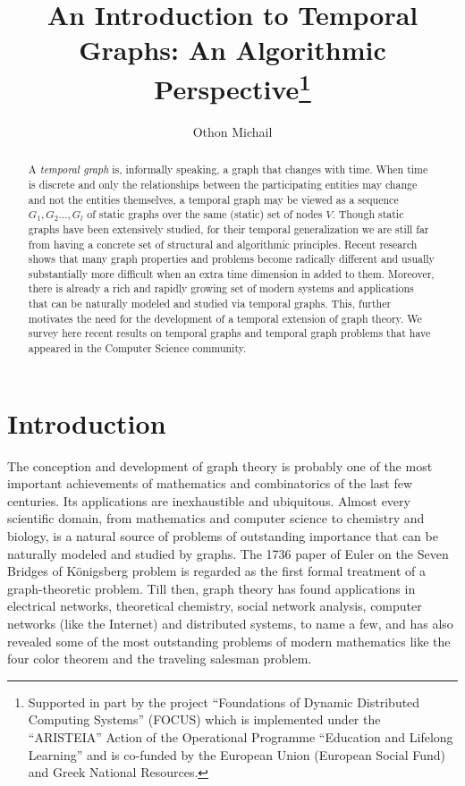 \documentclass[oribibl, 11pt]{llncs}
\title{An Introduction to Temporal Graphs: An Algorithmic Perspective\thanks{Supported in part by the project ``Foundations of Dynamic Distributed Computing Systems'' (\textsf{FOCUS}) which is implemented under the ``ARISTEIA'' Action of the  Operational Programme ``Education and Lifelong Learning'' and is co-funded by the European Union (European Social Fund) and Greek National Resources.}}
\author{Othon Michail}
\institute{Computer Technology Institute \& Press ``Diophantus'' (CTI),\\N. Kazantzaki Str., Patras University Campus,\\ Rio, P.O. Box 1382, 26504,\\Patras, Greece\\
Email:\email{ michailo@cti.gr}\\ Phone: +30 2610 960300}
\begin{document}
\maketitle

\begin{abstract}
A \emph{temporal graph} is, informally speaking, a graph that changes with time.  When time is discrete and only the relationships between the participating entities may change and not the entities themselves, a temporal graph may be viewed as a sequence $G_1,G_2\ldots,G_l$ of static graphs over the same (static) set of nodes $V$. Though static graphs have been extensively studied, for their temporal generalization we are still far from having a concrete set of structural and algorithmic principles. Recent research shows that many graph properties and problems become radically different and usually substantially more difficult when an extra time dimension in added to them. Moreover, there is already a rich and rapidly growing set of modern systems and applications that can be naturally modeled and studied via temporal graphs. This, further motivates the need for the development of a temporal extension of graph theory. We survey here recent results on temporal graphs and temporal graph problems that have appeared in the Computer Science community.
\end{abstract}

\section{Introduction}
\label{sec:intro}

The conception and development of graph theory is probably one of the most important achievements of mathematics and combinatorics of the last few centuries. Its applications are inexhaustible and ubiquitous. Almost every scientific domain, from mathematics and computer science to chemistry and biology, is a natural source of problems of outstanding importance that can be naturally modeled and studied by graphs. The 1736 paper of Euler on the Seven Bridges of K{\" o}nigsberg problem is regarded as the first formal treatment of a graph-theoretic problem. Till then, graph theory has found applications in electrical networks, theoretical chemistry, social network analysis, computer networks (like the Internet) and distributed systems, to name a few, and has also revealed some of the most outstanding problems of modern mathematics like the four color theorem and the traveling salesman problem.
\end{document}
